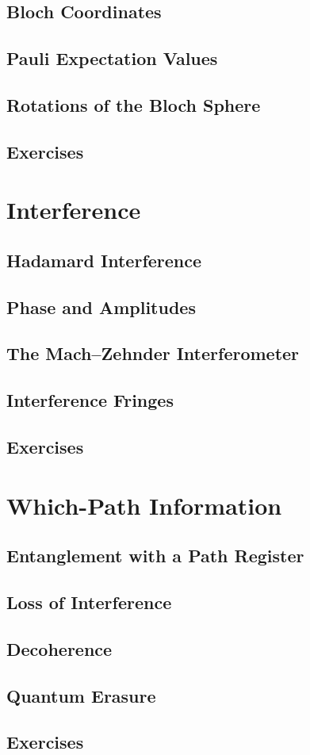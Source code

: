 \documentclass[11pt,a4paper]{article}
\begin{document}
\subsection{Bloch Coordinates}

\subsection{Pauli Expectation Values}

\subsection{Rotations of the Bloch Sphere}

\subsection{Exercises}


\section{Interference}

\subsection{Hadamard Interference}

\subsection{Phase and Amplitudes}

\subsection{The Mach--Zehnder Interferometer}

\subsection{Interference Fringes}

\subsection{Exercises}


\section{Which-Path Information}

\subsection{Entanglement with a Path Register}

\subsection{Loss of Interference}

\subsection{Decoherence}

\subsection{Quantum Erasure}

\subsection{Exercises}
\end{document}

